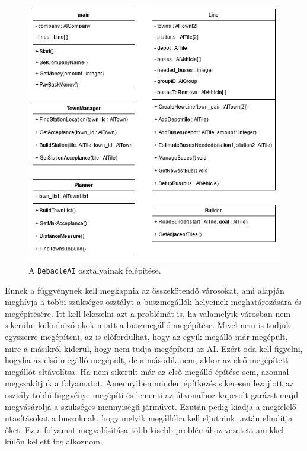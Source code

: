 \begin{figure}
	\centering
	\includegraphics[width=\textwidth]{images/line.png}
	\caption{A \texttt{DebacleAI} osztályainak felépítése.}
	\label{fig:line}
\end{figure}

Ennek a függvénynek kell megkapnia az összekötendő városokat, ami alapján meghívja a többi szükséges osztályt a buszmegállók helyeinek meghatározására és megépítésére. Itt kell lekezelni azt a problémát is, ha valamelyik városban nem sikerülni különböző okok miatt a buszmegálló megépítése. Mivel nem is tudjuk egyszerre megépíteni, az is előfordulhat, hogy az egyik megálló már megépült, mire a másikról kiderül, hogy nem tudja megépíteni az AI. Ezért oda kell figyelni, hogyha az első megálló megépült, de a második nem, akkor az első megépített megállót eltávolítsa. Ha nem sikerült már az első megálló építése sem, azonnal megszakítjuk a folyamatot. Amennyiben minden építkezés sikeresen lezajlott az osztály többi függvénye megépíti és lementi az útvonalhoz kapcsolt garázst majd megvásárolja a szükséges mennyiségű járművet. Ezután pedig kiadja a megfelelő utasításokat a buszoknak, hogy melyik megállóba kell eljutniuk, aztán elindítja őket. Ez a folyamat megvalósítása több kisebb problémához vezetett amikkel külön kellett foglalkoznom.

